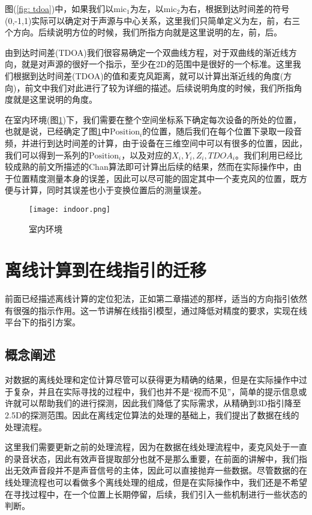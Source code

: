 \documentclass[winfonts,oneside]{njuthesis}
\begin{document}
		图(\ref{fig: tdoa})中，如果我们以$\text{mic}_1$为左，以$\text{mic}_2$为右，根据到达时间差的符号(0,-1,1)实际可以确定对于声源与中心关系，这里我们只简单定义为左，前，右三个方向。后续说明方位的时候，我们所指方向就是这里说明的左，前，后。
	
		由到达时间差(TDOA)我们很容易确定一个双曲线方程，对于双曲线的渐近线方向，就是对声源的很好一个指示，至少在2D的范围中是很好的一个标准。这里我们根据到达时间差(TDOA)的值和麦克风距离，就可以计算出渐近线的角度(方向)，前文中我们对此进行了较为详细的描述。后续说明角度的时候，我们所指角度就是这里说明的角度。
		
		在室内环境(图\ref{fig: indoor})下，我们需要在整个空间坐标系下确定每次设备的所处的位置，也就是说，已经确定了图\ref{fig: indoor}中$\text{Position}_i$的位置，随后我们在每个位置下录取一段音频，并进行到达时间差的计算，由于设备在三维空间中可以有很多的位置，因此，我们可以得到一系列的$\text{Position}_i$，以及对应的$X_i,Y_i,Z_i,TDOA_i$。我们利用已经比较成熟的前文所描述的Chan算法即可计算出后续的结果，然而在实际操作中，由于位置精度测量本身的误差，因此可以尽可能的固定其中一个麦克风的位置，既方便与计算，同时其误差也小于变换位置后的测量误差。
		
		\begin{figure}[H]
			\centering
			\texttt{[image: indoor.png]} 
			\caption{{室内环境}}
			\label{fig: indoor}
		\end{figure}
		
	
	\section{离线计算到在线指引的迁移}
		
		前面已经描述离线计算的定位犯法，正如第二章描述的那样，适当的方向指引依然有很强的指示作用。这一节讲解在线指引模型，通过降低对精度的要求，实现在线平台下的指引方案。
	
		\subsection{概念阐述}
			
			对数据的离线处理和定位计算尽管可以获得更为精确的结果，但是在实际操作中过于复杂，并且在实际寻找的过程中，我们也并不是“视而不见”，简单的提示信息或许就可以帮助我们的进行探测，因此我们降低了实际需求，从精确到3D指引降至2.5D的探测范围。因此在离线定位算法的处理的基础上，我们提出了数据在线的处理流程。
		
			这里我们需要更新之前的处理流程，因为在数据在线处理流程中，麦克风处于一直的录音状态，因此有效声音提取部分也就不是那么重要，在前面的讲解中，我们指出无效声音段并不是声音信号的主体，因此可以直接抛弃一些数据。尽管数据的在线处理流程也可以看做多个离线处理的组成，但是在实际操作中，我们还是不希望在寻找过程中，在一个位置上长期停留，后续，我们引入一些机制进行一些状态的判断。
			
\end{document}
